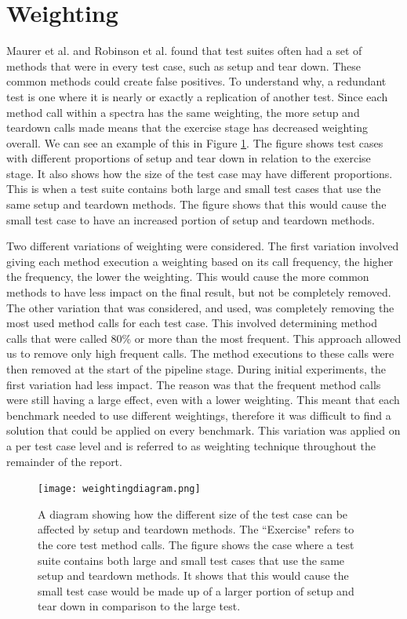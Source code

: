 \section{Weighting }
Maurer et al. \cite{koochakzadeh2009test} and Robinson et al. \cite{li2008static} found that test suites often had a set of methods that were in every test case, such as setup and tear down. These common methods could create false positives. To understand why, a redundant test is one where it is nearly or exactly a replication of another test. Since each method call within a spectra has the same weighting, the more setup and teardown calls made means that the exercise stage has decreased weighting overall. We can see an example of this in Figure \ref{fig:weightingdiagram}. The figure shows test cases with different proportions of setup and tear down in relation to the exercise stage. It also shows how the size of the test case may have different proportions. This is when a test suite contains both large and small test cases that use the same setup and teardown methods. The figure shows that this would cause the small test case to have an increased portion of setup and teardown methods.

Two different variations of weighting were considered. The first variation involved giving each method execution a weighting based on its call frequency, the higher the frequency, the lower the weighting. This would cause the more common methods to have less impact on the final result, but not be completely removed. The other variation that was considered, and used, was completely removing the most used method calls for each test case. This involved determining method calls that were called 80\% or more than the most frequent. This approach allowed us to remove only high frequent calls. The method executions to these calls were then removed at the start of the pipeline stage. During initial experiments, the first variation had less impact. The reason was that the frequent method calls were still having a large effect, even with a lower weighting. This meant that each benchmark needed to use different weightings, therefore it was difficult to find a solution that could be applied on every benchmark. This variation was applied on a per test case level and is referred to as weighting technique throughout the remainder of the report.

\begin{figure}[h]
\texttt{[image: weightingdiagram.png]}
\caption{A diagram showing how the different size of the test case can be affected by setup and teardown methods. The ``Exercise" refers to the core test method calls. The figure shows the case where a test suite contains both large and small test cases that use the same setup and teardown methods. It shows that this would cause the small test case would be made up of a larger portion of setup and tear down in comparison to the large test.}
\label{fig:weightingdiagram}
\end{figure}

